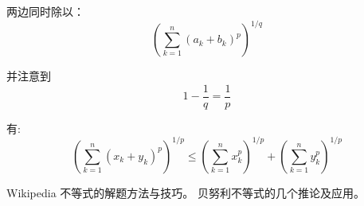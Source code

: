 \documentclass[a4paper]{article} %
\numberwithin{equation}{section} %
\begin{document}
两边同时除以：
\begin{equation}
\left(\sum_{k=1}^n(a_k+b_k)^p\right)^{1/q}
\end{equation}

并注意到
\begin{equation}
1-\frac{1}{q}=\frac{1}{p}
\end{equation}

有:
\begin{equation}
\left(\sum_{k=1}^n(x_k+y_k)^p\right)^{1/p}\le\left(\sum_{k=1}^nx_k^p\right)^{1/p}+
\left(\sum_{k=1}^ny_k^p\right)^{1/p}
\end{equation}
\begin{thebibliography}{99}
Wikipedia
不等式的解题方法与技巧。
贝努利不等式的几个推论及应用。
\end{thebibliography}
\end{document}
